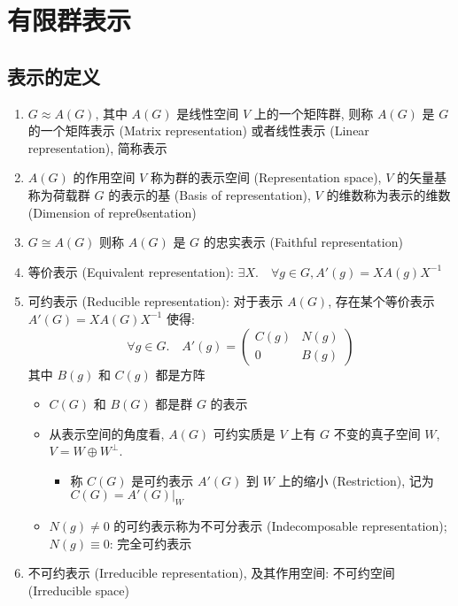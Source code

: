 \documentclass[12pt,a4paper]{article}%
\numberwithin{equation}{section}%
\begin{document}
\section{有限群表示} %
\label{sec:reps}
\subsection{表示的定义} %
\label{sub:def_reps}
\begin{enumerate}
	\item $G\approx A(G)$, 其中 $A(G)$ 是线性空间 $V$ 上的一个矩阵群, 则称 $A(G)$ 是 $G$ 的一个矩阵表示 (Matrix representation) 或者线性表示 (Linear representation), 简称表示
	\item $A(G)$ 的作用空间 $V$ 称为群的表示空间 (Representation space), $V$ 的矢量基称为荷载群 $G$ 的表示的基 (Basis of representation), $V$ 的维数称为表示的维数 (Dimension of repre0sentation)
	\item $G\cong A(G)$ 则称 $A(G)$ 是 $G$ 的忠实表示 (Faithful representation)
	\item 等价表示 (Equivalent representation): $\exists X.\quad \forall g\in G, A'(g) = XA(g)X^{-1}$
	\item 可约表示 (Reducible representation): 对于表示 $A(G)$, 存在某个等价表示 $A'(G) = XA(G)X^{-1}$ 使得:
	\begin{equation}
	 	\forall g\in G.\quad A'(g) = \begin{pmatrix}
	 		C(g) & N(g) \\
	 		0    & B(g)
	 	\end{pmatrix}
	\end{equation}
	其中 $B(g)$ 和 $C(g)$ 都是方阵
	\begin{itemize}
		\item $C(G)$ 和 $B(G)$ 都是群 $G$ 的表示
		\item 从表示空间的角度看, $A(G)$ 可约实质是 $V$ 上有 $G$ 不变的真子空间 $W$, $V = W\oplus W^{\perp}$.
		\begin{itemize}
			\item 称 $C(G)$ 是可约表示 $A'(G)$ 到 $W$ 上的缩小 (Restriction), 记为 $C(G) = \left.A'(G)\right|_W$
		\end{itemize}
		\item $N(g)\neq 0$ 的可约表示称为不可分表示 (Indecomposable representation); $N(g) \equiv 0$: 完全可约表示
	\end{itemize}
	\item 不可约表示 (Irreducible representation), 及其作用空间: 不可约空间 (Irreducible space)

\end{enumerate}
\end{document}
